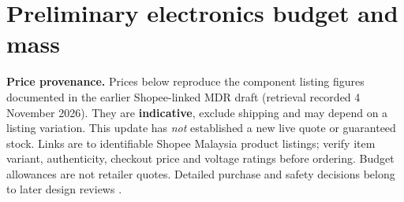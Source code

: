 
\section{Preliminary electronics budget and mass}
\label{sec:budget}
\textbf{Price provenance.} Prices below reproduce the component listing figures documented in the earlier Shopee-linked MDR draft (retrieval recorded 4 November 2026). They are \textbf{indicative}, exclude shipping and may depend on a listing variation. This update has \emph{not} established a new live quote or guaranteed stock. Links are to identifiable Shopee Malaysia product listings; verify item variant, authenticity, checkout price and voltage ratings before ordering. Budget allowances are not retailer quotes. Detailed purchase and safety decisions belong to later design reviews \cite{rtc2027app01,rtc2027app07}.

